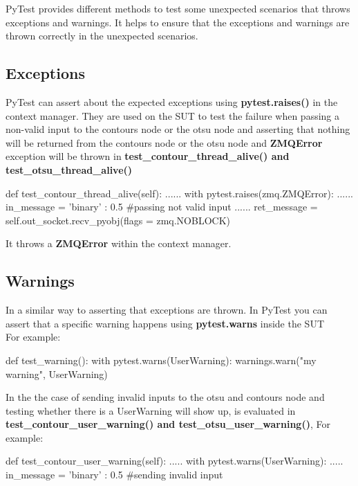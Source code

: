 PyTest provides different methods to test some unexpected scenarios that throws exceptions and warnings. It helps to ensure that the exceptions and warnings are thrown correctly in the unexpected scenarios.
\subsection{Exceptions}

PyTest can assert about the expected exceptions using \textbf{pytest.raises()} in the context manager.
They are used on the SUT to test the failure when passing a non-valid input to the contours node or the otsu node and asserting that nothing will be returned from the contours node or the otsu node and \textbf{ZMQError} exception will be thrown in \textbf{test\_contour\_thread\_alive() and test\_otsu\_thread\_alive()}

\begin{python}
def test_contour_thread_alive(self):
    ......
    with pytest.raises(zmq.ZMQError):
        ......
        in_message = { 'binary' : 0.5} #passing not valid input
        ......
        ret_message = self.out_socket.recv_pyobj(flags = zmq.NOBLOCK)
\end{python}

It throws a \textbf{ZMQError} within the context manager.

\subsection{Warnings}

In a similar way to asserting that exceptions are thrown. In PyTest you can assert that a specific warning happens using \textbf{pytest.warns} inside the SUT \\
For example:
\begin{python}
def test_warning():
    with pytest.warns(UserWarning):
        warnings.warn("my warning", UserWarning)
\end{python}
In the the case of sending invalid inputs to the otsu and contours node and testing whether there is a UserWarning will show up, is evaluated in \textbf{test\_contour\_user\_warning() and test\_otsu\_user\_warning()}, For example:

\begin{python}
def test_contour_user_warning(self):
    .....
    with pytest.warns(UserWarning):
        .....
        in_message = { 'binary' : 0.5} #sending invalid input

\end{python}